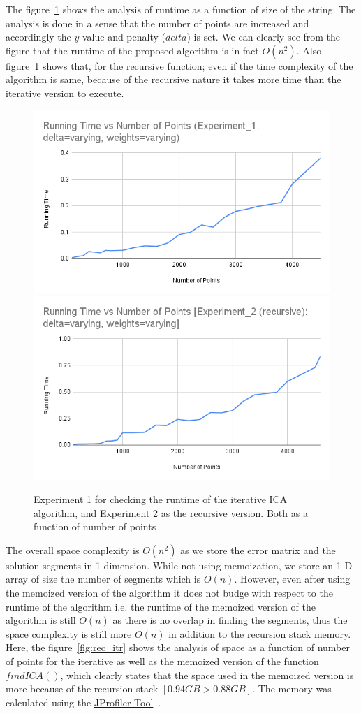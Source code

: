 \documentclass{article}
\begin{document}
The figure~\ref{fig:ICArun} shows the analysis of runtime as a function of size of the string. The analysis is done in a sense that the number of points are increased and accordingly the $y$ value and penalty ($delta$) is set. We can clearly see from the figure that the runtime of the proposed algorithm is in-fact $O(n^2)$. Also figure~\ref{fig:ICArun} shows that, for the recursive function; even if the time complexity of the algorithm is same, because of the recursive nature it takes more time than the iterative version to execute.\\

\begin{figure}[ht]
    \centering
    \includegraphics[width=.45\textwidth]{Running Time vs Number of Points (Experiment_1_ delta=varying, weights=varying).png}
    \includegraphics[width=.45\textwidth]{Running Time vs Number of Points [Experiment_2 (recursive)_ delta=varying, weights=varying].png}
    \caption{Experiment 1 for checking the runtime of the iterative ICA algorithm, and Experiment 2 as the recursive version. Both as a function of number of points}
    \label{fig:ICArun}
\end{figure}

The overall space complexity is $O(n^2)$ as we store the error matrix and the solution segments in 1-dimension.  While not using memoization, we store an 1-D array of size the number of segments which is $O(n)$. However, even after using the memoized version of the algorithm it does not budge with respect to the runtime of the algorithm i.e. the runtime of the memoized version of the algorithm is still $O(n)$ as there is no overlap in finding the segments, thus the space complexity is still more $O(n)$ in addition to the recursion stack memory. Here, the figure~\ref{fig:rec_itr} shows the analysis of space as a function of number of points for the iterative as well as the memoized version of the function $findICA()$, which clearly states that the space used in the memoized version is more because of the recursion stack $[0.94 GB > 0.88 GB]$. The memory was calculated using the \href{https://www.ej-technologies.com/products/jprofiler/overview.html}{JProfiler Tool}~\cite{cho2006jprofiler}.\\
\end{document}
